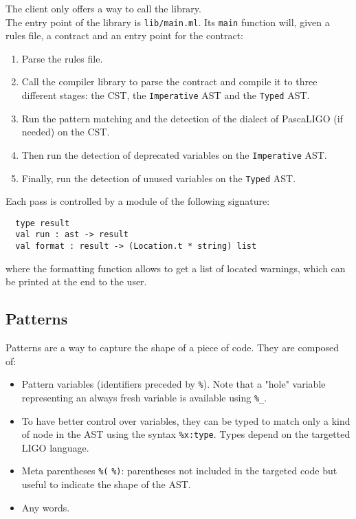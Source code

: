 \documentclass[10pt,a4paper]{article}
\begin{document}
The client only offers a way to call the library.\\
The entry point of the library is \verb|lib/main.ml|. Its \verb|main| function will, given a rules file, a contract and an entry point for the contract:
\begin{enumerate}
\item Parse the rules file.
\item Call the compiler library to parse the contract and compile it to three different stages: the CST, the \verb|Imperative| AST and the \verb|Typed| AST.
\item Run the pattern matching and the detection of the dialect of PascaLIGO (if needed) on the CST.
\item Then run the detection of deprecated variables on the \verb|Imperative| AST.
\item Finally, run the detection of unused variables on the \verb|Typed| AST.
\end{enumerate}

Each pass is controlled by a module of the following signature:
\begin{verbatim}
  type result
  val run : ast -> result
  val format : result -> (Location.t * string) list
\end{verbatim}

where the formatting function allows to get a list of located warnings, which can be printed at the end to the user.

\subsection{Patterns}
Patterns are a way to capture the shape of a piece of code. They are composed of:

\begin{itemize}
\item Pattern variables (identifiers preceded by \verb|%|). Note that a "hole" variable representing an always fresh variable is available using \verb|%_|.
\item To have better control over variables, they can be typed to match only a kind of node in the AST using the syntax \verb|%x:type|. Types depend on the targetted LIGO language.
\item Meta parentheses \verb|%(| \verb|%)|: parentheses not included in the targeted code but useful to indicate the shape of the AST.
\item Any words.
\end{itemize}
\end{document}
